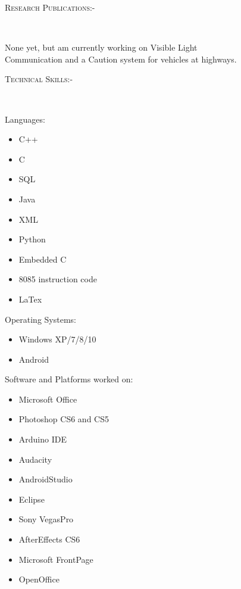 \documentclass[11pt]{article}
\begin{document}
\begin{figure}[ht]
\begin{minipage}[b]{0.45\linewidth}
\flushleft
\noindent\colorbox{WeakOrange}
{\parbox{\dimexpr\textwidth-2\fboxsep\relax}{\textsc{Research Publications:-}}}\\
\begin{small}
None yet, but am currently working on Visible Light Communication and a Caution system for vehicles at highways.
\end{small}
\noindent\colorbox{WeakOrange}
{\parbox{\dimexpr\textwidth-2\fboxsep\relax}{\textsc{Technical Skills:-}}}\\
\begin{small}
\begin{enumerate}
\noindent\colorbox{FaintOrange}
{\parbox{\dimexpr\textwidth-2\fboxsep\relax}
{\item  	Languages:}}

\begin{itemize}
\item C++
\item C
\item SQL
\item Java
\item XML
\item Python
\item Embedded C
\item 8085 instruction code
\item LaTex
\end{itemize}
\noindent\colorbox{FaintOrange}
{\parbox{\dimexpr\textwidth-2\fboxsep\relax}
{
\item  Operating Systems:
}}
\begin{itemize}
\item Windows XP/7/8/10
\item Android
\end{itemize}
\noindent\colorbox{FaintOrange}
{\parbox{\dimexpr\textwidth-2\fboxsep\relax}
{
\item  Software and Platforms worked on:
}}
\begin{itemize}
\item Microsoft Office
\item Photoshop CS6 and CS5
\item Arduino IDE
\item Audacity
\item AndroidStudio
\item Eclipse
\item Sony VegasPro
\item AfterEffects CS6
\item  Microsoft FrontPage
\item OpenOffice


\end{itemize}
\end{enumerate}
\end{small}
\end{minipage}
\end{figure}
\end{document}
